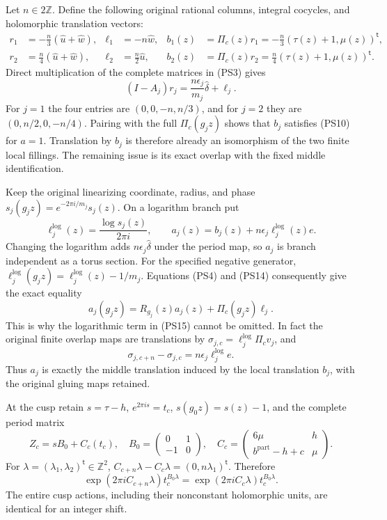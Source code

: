 Let $n\in2\mathbb Z$. Define the following original rational columns,
integral cocycles, and holomorphic translation vectors:
\[
\begin{aligned}
 r_1&=-\frac n3(\widehat u+\widehat w),&
 \ell_1&=-n\widehat w,&
 b_1(z)&=\Pi_c(z)r_1=-\frac n3(\tau(z)+1,\mu(z))^{\mathsf t},\\
 r_2&= \frac n4(\widehat u+\widehat w),&
 \ell_2&=\frac n2\widehat u,&
 b_2(z)&=\Pi_c(z)r_2=\frac n4(\tau(z)+1,\mu(z))^{\mathsf t}.
\end{aligned}
\tag{PS13}\label{pshift:eq:local-corrections}
\]
Direct multiplication of the complete matrices in (PS3) gives
\[
 (I-A_j)r_j=\frac{n\epsilon_j}{m_j}\widehat\delta+\ell_j.
 \tag{PS14}\label{pshift:eq:local-matrix-identity}
\]
For $j=1$ the four entries are $(0,0,-n,n/3)$, and for $j=2$
they are $(0,n/2,0,-n/4)$. Pairing with the full $\Pi_c(g_jz)$
shows that $b_j$ satisfies (PS10) for $a=1$.
Translation by $b_j$ is therefore already an isomorphism of the
two finite local fillings. The remaining issue is its exact overlap
with the fixed middle identification.

Keep the original linearizing coordinate, radius, and phase
$s_j(g_jz)=e^{-2\pi i/m_j}s_j(z)$. On a logarithm branch put
\[
 \ell^{\log}_j(z)=\frac{\log s_j(z)}{2\pi i},\qquad
 a_j(z)=b_j(z)+n\epsilon_j \ell^{\log}_j(z)e.
 \tag{PS15}\label{pshift:eq:finite-middle-sections}
\]
Changing the logarithm adds $n\epsilon_j\widehat\delta$ under the
period map, so $a_j$ is branch independent as a torus section.
For the specified negative generator, $\ell^{\log}_j(g_jz)=\ell^{\log}_j(z)-1/m_j$.
Equations (PS4) and (PS14) consequently give the exact equality
\[
 a_j(g_jz)=R_{g_j}(z)a_j(z)+\Pi_c(g_jz)\ell_j.
 \tag{PS16}\label{pshift:eq:local-affine-cocycle}
\]
This is why the logarithmic term in (PS15) cannot be omitted.
In fact the original finite overlap maps are translations by
$\sigma_{j,c}=\ell^{\log}_j\Pi_c v_j$, and
\[
                  \sigma_{j,c+n}-\sigma_{j,c}
                     =n\epsilon_j\ell^{\log}_je.
 \tag{PS17}\label{pshift:eq:actual-overlap-difference}
\]
Thus $a_j$ is exactly the middle translation induced by the local
translation $b_j$, with the original gluing maps retained.

At the cusp retain $s=\tau-h$, $e^{2\pi is}=t_c$, $s(g_0z)=s(z)-1$,
and the complete period matrix
\[
 Z_c=sB_0+C_c(t_c),\quad
 B_0=\begin{pmatrix}0&1\\-1&0\end{pmatrix},\quad
 C_c=\begin{pmatrix}6\mu&h\\ b^{\mathrm{part}}-h+c&\mu\end{pmatrix}.
 \tag{PS18}\label{pshift:eq:cusp-periods}
\]
For $\lambda=(\lambda_1,\lambda_2)^{\mathsf t}\in\mathbb Z^2$,
$C_{c+n}\lambda-C_c\lambda=(0,n\lambda_1)^{\mathsf t}$. Therefore
\[
 \exp(2\pi iC_{c+n}\lambda)t_c^{B_0\lambda}
       =\exp(2\pi iC_c\lambda)t_c^{B_0\lambda}.
 \tag{PS19}\label{pshift:eq:cusp-actions-identical}
\]
The entire cusp actions, including their nonconstant holomorphic units,
are identical for an integer shift.

